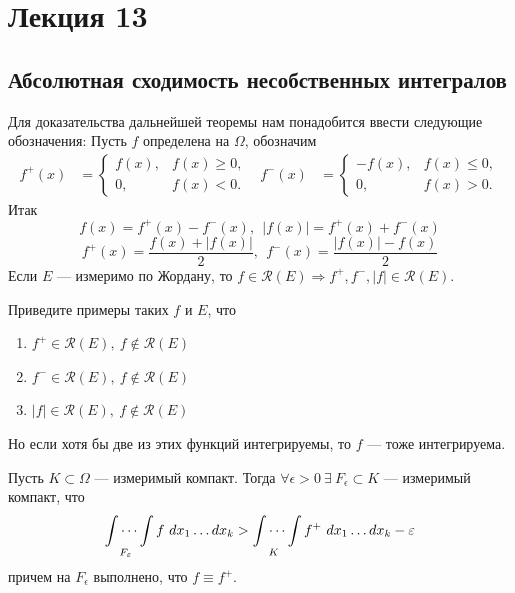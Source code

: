 \section{Лекция 13}
\subsection{Абсолютная сходимость несобственных интегралов}
Для доказательства дальнейшей теоремы нам понадобится ввести следующие обозначения: Пусть $f$ определена на $\Omega$, обозначим
\[
\begin{aligned}
f^{+}(x) &= \begin{cases}
f(x), & f(x) \geq 0,\\
0,    & f(x) < 0.
\end{cases} &
f^{-}(x) &= \begin{cases}
-f(x), & f(x) \leq 0,\\
0,     & f(x) > 0.
\end{cases}
\end{aligned}
\]
Итак
\[f(x)=f^+(x)-f^-(x),\ \ |f(x)|=f^+(x)+f^-(x)\]
\[f^+(x)=\frac{f(x)+|f(x)|}{2},\ \ f^-(x)=\frac{|f(x)|-f(x)}{2}\]
Если $E$ --- измеримо по Жордану, то $f\in \mathcal{R}(E)\Rightarrow f^+,f^-, |f|\in \mathcal{R}(E)$.
\begin{exercise}
    Приведите примеры таких $f$ и $E$, что 
    \begin{enumerate}
        \item $f^+\in \mathcal{R}(E),\ f\not\in \mathcal{R}(E)$
        \item $f^-\in \mathcal{R}(E),\ f\not\in \mathcal{R}(E)$
        \item $|f|\in \mathcal{R}(E),\ f\not\in \mathcal{R}(E)$
    \end{enumerate}
\end{exercise}
\noindent Но если хотя бы две из этих функций интегрируемы, то $f$ --- тоже интегрируема.
\begin{lemma}
    Пусть $K\subset \Omega$ --- измеримый компакт. Тогда $\forall \epsilon>0\ \exists\ F_{\epsilon}\subset K$ --- измеримый компакт, что 
    \[\idotsint\limits_{F_{\epsilon}}f\ dx_1 \dots dx_k>\idotsint\limits_{K}f^+\ dx_1 \dots dx_k - \epsilon\]
    причем на $F_{\epsilon}$ выполнено, что $f\equiv f^+$.
\end{lemma}

